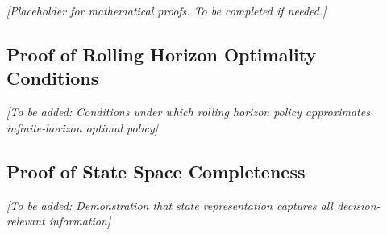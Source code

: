 \textit{[Placeholder for mathematical proofs. To be completed if needed.]}

\subsection{Proof of Rolling Horizon Optimality Conditions}

\textit{[To be added: Conditions under which rolling horizon policy approximates infinite-horizon optimal policy]}

\subsection{Proof of State Space Completeness}

\textit{[To be added: Demonstration that state representation captures all decision-relevant information]}
